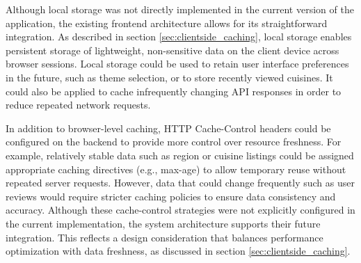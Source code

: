 Although local storage was not directly implemented in the current version of the application, 
the existing frontend architecture allows for its straightforward integration. 
As described in section \ref{sec:clientside_caching}, local storage enables persistent storage of lightweight, non-sensitive data on the client device 
across browser sessions.
Local storage could be used to retain user interface preferences in the future, such as theme selection, 
or to store recently viewed cuisines. 
It could also be applied to cache infrequently changing API responses 
in order to reduce repeated network requests. 

In addition to browser-level caching, HTTP Cache-Control headers could be configured on the backend 
to provide more control over resource freshness. 
For example, relatively stable data such as region or cuisine listings 
could be assigned appropriate caching directives (e.g., max-age) 
to allow temporary reuse without repeated server requests.
However, data that could change frequently such as user reviews would require stricter caching policies 
to ensure data consistency and accuracy. 
Although these cache-control strategies were not explicitly configured in the current implementation, 
the system architecture supports their future integration. 
This reflects a design consideration that balances performance optimization with data freshness, as discussed in section \ref{sec:clientside_caching}.



